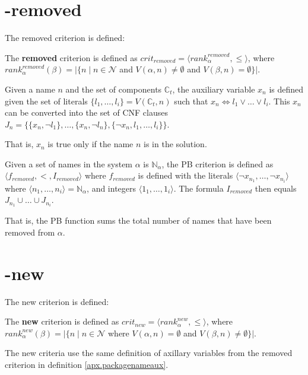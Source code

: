 \section{-removed}

The removed criterion is defined:
\begin{defs}
	The \textbf{removed} criterion is defined as $crit_{removed} = \langle rank^{removed}_{\alpha}, \leq \rangle$,
	where $rank^{removed}_{\alpha}(\beta) = |\{n \mid n \in \mathcal{N}$ and $V(\alpha,n) \neq \emptyset$ and $V(\beta,n) = \emptyset\}|$.
\end{defs}

\begin{defs}
\label{apx.packagenameaux}
Given a name $n$ and the set of components $\mathbb{C}_t$,
the auxiliary variable $x_n$ is defined given the set of literals $\{l_1,\ldots,l_i\} = V(\mathbb{C}_t ,n)$ 
such that $x_n \Leftrightarrow l_1 \vee \ldots \vee l_i$.
This $x_n$ can be converted into the set of CNF clauses $J_n = \{ \{x_n, \neg l_1\},\ldots, \{x_n, \neg l_n\}, \{\neg x_n, l_1,\ldots, l_i\}\}$.
\end{defs}
That is, $x_n$ is true only if the name $n$ is in the solution.

\begin{defs}
Given a set of names in the system $\alpha$ is $\mathbb{N}_{\alpha}$, the PB criterion is defined as $\langle f_{removed}, <, I_{removed} \rangle$ where 
$f_{removed}$ is defined with the literals $\langle \neg x_{n_1},\ldots, \neg x_{n_i}\rangle$ where $\langle n_1,\ldots, n_i \rangle = \mathbb{N}_{\alpha}$, and integers $\langle 1_1,\ldots,1_i\rangle$.
The formula $I_{removed}$ then equals $J_{n_1} \cup \ldots \cup J_{n_i}$.
\end{defs}
That is, the PB function sums the total number of names that have been removed from $\alpha$.


\section{-new}

The new criterion is defined:

\begin{defs}
	The \textbf{new} criterion is defined as $crit_{new} = \langle rank^{new}_{\alpha}, \leq \rangle$,
	where $rank^{new}_{\alpha}(\beta) = |\{n \mid n \in \mathcal{N}$ where $V(\alpha,n) = \emptyset$ and $V(\beta,n) \neq \emptyset\}|$.
\end{defs}

The new criteria use the same definition of axillary variables from the removed criterion in definition \ref{apx.packagenameaux}.

